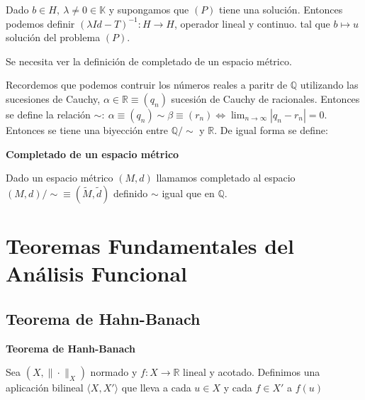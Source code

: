 \documentclass[openany]{book}
\begin{document}
\begin{corollary}
    Dado $ b \in H,\ \lambda \ne 0 \in \mathbb{K}$ y supongamos que $ (P)$ tiene una solución. Entonces podemos definir $ (\lambda Id-T) ^{-1}: H\to H$, operador lineal y continuo. tal que $ b \mapsto u$ solución del problema $ (P)$. 
    
\end{corollary}



Se necesita ver la definición de completado de un espacio métrico.

Recordemos que podemos contruir los números reales a paritr de $ \mathbb{Q}$ utilizando las sucesiones de Cauchy, $ \alpha \in \mathbb{R} \equiv (q_n)$ sucesión de Cauchy de racionales. Entonces se define la relación $ \sim:\ \alpha \equiv (q_n) \sim \beta \equiv (r_n) \iff \lim_{n \to \infty} |q_n-r_n| = 0$. Entonces se tiene una biyección entre $ \mathbb{Q}/\sim$ y $ \mathbb{R}$. De igual forma se define:

\begin{definition}
    \textbf{Completado de un espacio métrico}

    Dado un espacio métrico $ (M,d)$ llamamos completado al espacio $ (M,d)/\sim \equiv (\widetilde{M},\widetilde{d})$ definido $ \sim$ igual que en $ \mathbb{Q}$.
\end{definition}


\chapter{Teoremas Fundamentales del Análisis Funcional}

\section{Teorema de Hahn-Banach}
\begin{theorem}
    \textbf{Teorema de Hanh-Banach}

    Sea $ (X,\|\cdot \|_{X})$ normado y $ f: X \to \mathbb{R}$ lineal y acotado. Definimos una aplicación bilineal $ \langle X, X' \rangle $ que lleva a cada $ u \in X$ y cada $ f \in X'$ a $ f(u)$

\end{theorem}
\end{document}
